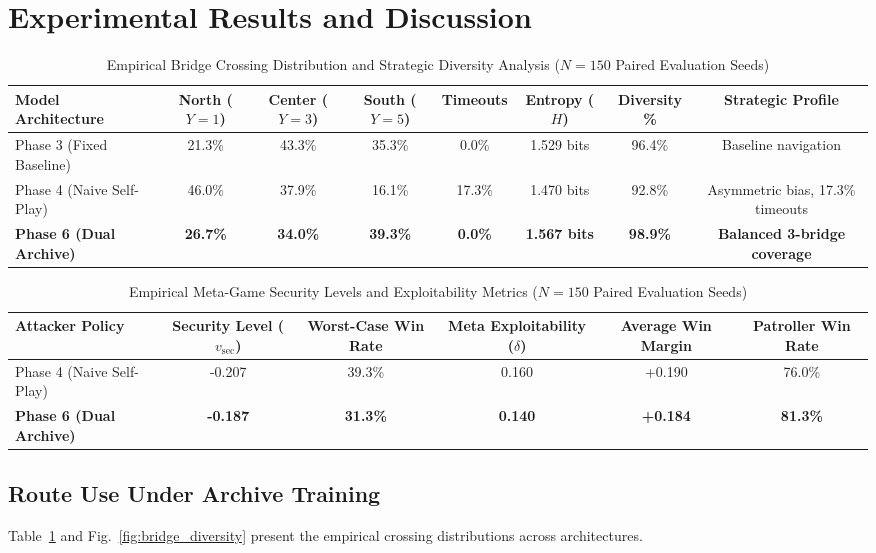 \documentclass[conference]{IEEEtran}
\begin{document}
\section{Experimental Results and Discussion}

\begin{table}[t]
\caption{Empirical Bridge Crossing Distribution and Strategic Diversity Analysis ($N=150$ Paired Evaluation Seeds)}
\label{tab:bridge_diversity}
\centering
\begin{tabular}{lccccccc}
\toprule
\textbf{Model Architecture} & \textbf{North ($Y=1$)} & \textbf{Center ($Y=3$)} & \textbf{South ($Y=5$)} & \textbf{Timeouts} & \textbf{Entropy ($H$)} & \textbf{Diversity \%} & \textbf{Strategic Profile} \\
\midrule
Phase 3 (Fixed Baseline)        & 21.3\% & 43.3\% & 35.3\% & 0.0\%  & 1.529 bits & 96.4\% & Baseline navigation \\
Phase 4 (Naive Self-Play)       & 46.0\% & 37.9\% & 16.1\% & 17.3\% & 1.470 bits & 92.8\% & Asymmetric bias, 17.3\% timeouts \\
\textbf{Phase 6 (Dual Archive)} & \textbf{26.7\%} & \textbf{34.0\%} & \textbf{39.3\%} & \textbf{0.0\%}  & \textbf{1.567 bits} & \textbf{98.9\%} & \textbf{Balanced 3-bridge coverage} \\
\bottomrule
\end{tabular}
\end{table}

\begin{table}[t]
\caption{Empirical Meta-Game Security Levels and Exploitability Metrics ($N=150$ Paired Evaluation Seeds)}
\label{tab:exploitability}
\centering
\begin{tabular}{lccccc}
\toprule
\textbf{Attacker Policy} & \textbf{Security Level ($v_{\text{sec}}$)} & \textbf{Worst-Case Win Rate} & \textbf{Meta Exploitability ($\delta$)} & \textbf{Average Win Margin} & \textbf{Patroller Win Rate} \\
\midrule
Phase 4 (Naive Self-Play)       & -0.207 & 39.3\% & 0.160 & +0.190 & 76.0\% \\
\textbf{Phase 6 (Dual Archive)} & \textbf{-0.187} & \textbf{31.3\%} & \textbf{0.140} & \textbf{+0.184} & \textbf{81.3\%} \\
\bottomrule
\end{tabular}
\end{table}

\subsection{Route Use Under Archive Training}
Table~\ref{tab:bridge_diversity} and Fig.~\ref{fig:bridge_diversity} present the empirical crossing distributions across architectures.
\end{document}
